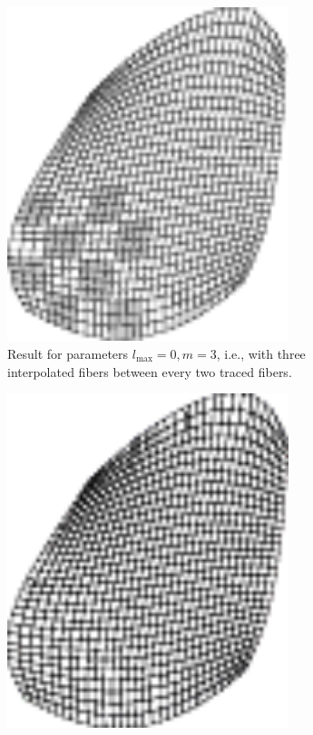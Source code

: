 \begin{figure}%
  \centering%
  \begin{subfigure}[t]{0.45\textwidth}%
    \centering%
    \includegraphics[width=0.9\textwidth,trim=0 0 8mm 1cm, clip]{images/parallel_fiber_estimation/31x31fibers_l0_m3_2In_dirichlet.pdf}
    \caption{Result for parameters $l_\text{max}=0, m=3$, i.e., with three interpolated fibers between every two traced fibers.}%
    \label{fig:31x31_l0_center}%
  \end{subfigure}
  \quad
  \begin{subfigure}[t]{0.45\textwidth}%
    \centering%
    \includegraphics[width=0.9\textwidth,trim=0 0 8mm 1cm, clip]{images/parallel_fiber_estimation/31x31fibers_l2_m0_2In_dirichlet.pdf}

\end{subfigure}
\end{figure}
